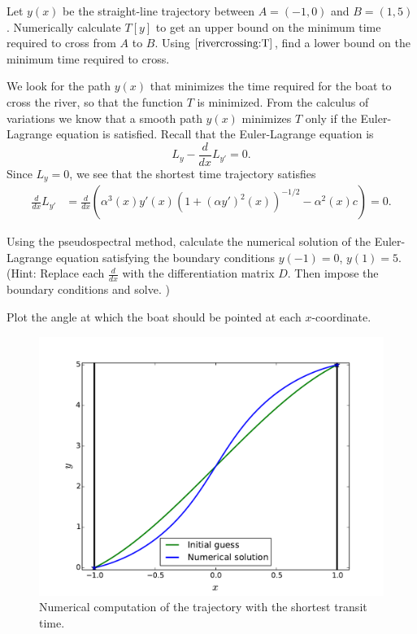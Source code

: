 \begin{problem}
	Let $y(x)$ be the straight-line trajectory between $A = (-1,0)$ and $B=(1,5)$. Numerically calculate $T[y]$ to get an upper bound on the minimum time required to cross from $A$ to $B$. Using $\eqref{rivercrossing:T}$, find a lower bound on the minimum time required to cross.
\end{problem}

We look for the path $y(x)$ that minimizes the time required for the boat to cross the river, so that the function $T$ is minimized. From the calculus of variations we know that a smooth path $y(x)$ minimizes $T$ only if the Euler-Lagrange equation is satisfied. Recall that the Euler-Lagrange equation is 
\[
L_{y} - \frac{d}{dx}L_{y'} = 0.
\]
Since $L_y = 0$, we see that the shortest time trajectory satisfies
\begin{align*}
	\frac{d}{dx}L_{y'} &=  \frac{d}{dx}\left( \alpha^3(x) y'(x) (1 + (\alpha y')^2(x))^{-1/2} - \alpha^2(x) c \right) = 0.
\end{align*}

\begin{problem}
	Using the pseudospectral method, calculate the numerical solution of the Euler-Lagrange equation satisfying the boundary conditions $y(-1) = 0$, $y(1) = 5$. (Hint: Replace each $\frac{d}{dx}$ with the differentiation matrix $D$. Then impose the boundary conditions and solve.  )
\end{problem}

\begin{problem}
	Plot the angle at which the boat should be pointed at each $x$-coordinate. 
\end{problem}

\begin{figure}
\centering
\includegraphics[width=\textwidth]{minimum_time_rivercrossing.pdf}
\caption{Numerical computation of the trajectory with the shortest transit time.}
\label{fig:rivercrossing_current}
\end{figure}



